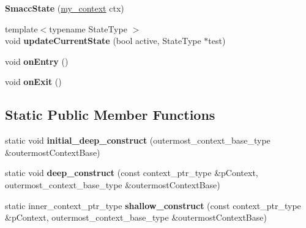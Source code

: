 \begin{DoxyCompactItemize}
\item 
{\bfseries Smacc\+State} (\hyperlink{structsmacc_1_1SmaccState_1_1my__context}{my\+\_\+context} ctx)\hypertarget{classsmacc_1_1SmaccState_adc225018fe91da47e6e9f1d20150b26a}{}\label{classsmacc_1_1SmaccState_adc225018fe91da47e6e9f1d20150b26a}

\item 
{\footnotesize template$<$typename State\+Type $>$ }\\void {\bfseries update\+Current\+State} (bool active, State\+Type $\ast$test)\hypertarget{classsmacc_1_1SmaccState_abc2a2b5e635b0ba09fcb350710b20117}{}\label{classsmacc_1_1SmaccState_abc2a2b5e635b0ba09fcb350710b20117}

\item 
void {\bfseries on\+Entry} ()\hypertarget{classsmacc_1_1SmaccState_a4a10a74fdbe51a798b8d651668b8ed9a}{}\label{classsmacc_1_1SmaccState_a4a10a74fdbe51a798b8d651668b8ed9a}

\item 
void {\bfseries on\+Exit} ()\hypertarget{classsmacc_1_1SmaccState_a82ca7c69153e86dc5eedf3f909560f3a}{}\label{classsmacc_1_1SmaccState_a82ca7c69153e86dc5eedf3f909560f3a}

\end{DoxyCompactItemize}
\subsection*{Static Public Member Functions}
\begin{DoxyCompactItemize}
\item 
static void {\bfseries initial\+\_\+deep\+\_\+construct} (outermost\+\_\+context\+\_\+base\+\_\+type \&outermost\+Context\+Base)\hypertarget{classsmacc_1_1SmaccState_af4b4635d16a32bdd3956e5d40ddbd01d}{}\label{classsmacc_1_1SmaccState_af4b4635d16a32bdd3956e5d40ddbd01d}

\item 
static void {\bfseries deep\+\_\+construct} (const context\+\_\+ptr\+\_\+type \&p\+Context, outermost\+\_\+context\+\_\+base\+\_\+type \&outermost\+Context\+Base)\hypertarget{classsmacc_1_1SmaccState_aac23d8a6909f75c5e5fca2a7c09b5368}{}\label{classsmacc_1_1SmaccState_aac23d8a6909f75c5e5fca2a7c09b5368}

\item 
static inner\+\_\+context\+\_\+ptr\+\_\+type {\bfseries shallow\+\_\+construct} (const context\+\_\+ptr\+\_\+type \&p\+Context, outermost\+\_\+context\+\_\+base\+\_\+type \&outermost\+Context\+Base)\hypertarget{classsmacc_1_1SmaccState_a1dccb401e1a99031863a21a590d953e6}{}\label{classsmacc_1_1SmaccState_a1dccb401e1a99031863a21a590d953e6}

\end{DoxyCompactItemize}
